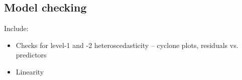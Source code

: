 \documentclass{article} %
\begin{document}
\subsection{Model checking}

Include:
\begin{itemize}
\item Checks for level-1 and -2 heteroscedasticity -- cyclone plots, residuals vs. predictors
\item Linearity

\end{itemize}


%
%
%
%	
%
%
\end{document}

